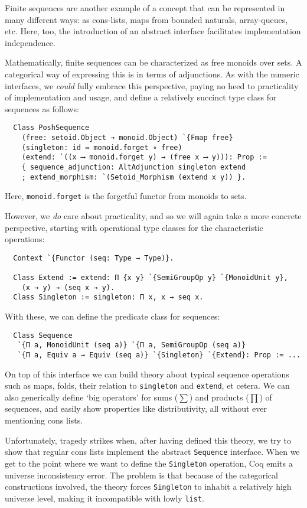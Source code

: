 \documentclass[a4paper,10pt,runningheads]{llncs}
\begin{document}
Finite sequences are another example of a concept that can be represented in many different ways: as cons-lists, maps from bounded naturals, array-queues, etc. Here, too, the introduction of an abstract interface facilitates implementation independence.

Mathematically, finite sequences can be characterized as free monoids over sets. A categorical way of expressing this is in terms of adjunctions. As with the numeric interfaces, we \emph{could} fully embrace this perspective, paying no heed to practicality of implementation and usage, and define a relatively succinct type class for sequences as follows:
\begin{lstlisting}
  Class PoshSequence
    (free: setoid.Object → monoid.Object) `{Fmap free}
    (singleton: id ⇛ monoid.forget ∘ free)
    (extend: `((x ⟶ monoid.forget y) → (free x ⟶ y))): Prop :=
    { sequence_adjunction: AltAdjunction singleton extend
    ; extend_morphism: `(Setoid_Morphism (extend x y)) }.
\end{lstlisting}
Here, \lstinline|monoid.forget| is the forgetful functor from monoids to sets.

However, we \emph{do} care about practicality, and so we will again take a more concrete perspective, starting with operational type classes for the characteristic operations:
\begin{lstlisting}
  Context `{Functor (seq: Type → Type)}.

  Class Extend := extend: Π {x y} `{SemiGroupOp y} `{MonoidUnit y},
    (x → y) → (seq x → y).
  Class Singleton := singleton: Π x, x → seq x.
\end{lstlisting}
With these, we can define the predicate class for sequences:
\begin{lstlisting}
  Class Sequence
   `{Π a, MonoidUnit (seq a)} `{Π a, SemiGroupOp (seq a)}
   `{Π a, Equiv a → Equiv (seq a)} `{Singleton} `{Extend}: Prop := ...
\end{lstlisting}
On top of this interface we can build theory about typical sequence operations such as maps, folds, their relation to \lstinline|singleton| and \lstinline|extend|, et cetera. We can also generically define `big operators' for sums ($\sum$) and products ($\prod$) of sequences, and easily show properties like distributivity, all without ever mentioning cons lists.

Unfortunately, tragedy strikes when, after having defined this theory, we try to show that regular cons lists implement the abstract \lstinline|Sequence| interface. When we get to the point where we want to define the \lstinline|Singleton| operation, Coq emits a universe inconsistency error. The problem is that because of the categorical constructions involved, the theory forces \lstinline|Singleton| to inhabit a relatively high universe level, making it incompatible with lowly \lstinline|list|.
\end{document}
